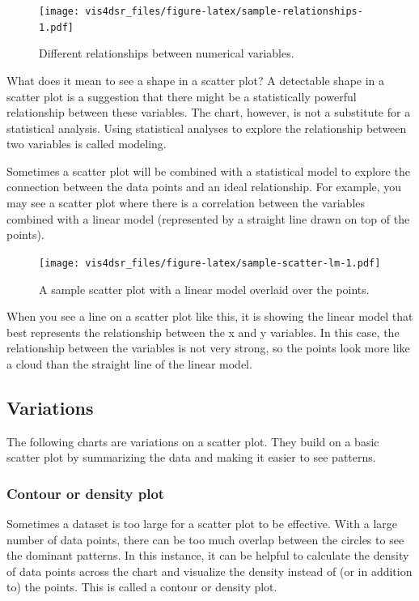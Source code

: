 \documentclass[
]{krantz}
\begin{document}
\begin{figure}
\centering
\texttt{[image: vis4dsr\_files/figure-latex/sample-relationships-1.pdf]}
\caption{\label{fig:sample-relationships}Different relationships between numerical variables.}
\end{figure}

What does it mean to see a shape in a scatter plot? A detectable shape in a scatter
plot is a suggestion that there might be a statistically powerful relationship
between these variables. The chart, however, is not a substitute for a statistical
analysis. Using statistical analyses to explore the relationship between two variables
is called modeling.

Sometimes a scatter plot will be combined with a statistical model to explore
the connection between the data points and an ideal relationship. For example, you
may see a scatter plot where there is a correlation between the variables
combined with a linear model (represented by a straight line drawn on top of the points).

\begin{figure}
\centering
\texttt{[image: vis4dsr\_files/figure-latex/sample-scatter-lm-1.pdf]}
\caption{\label{fig:sample-scatter-lm}A sample scatter plot with a linear model overlaid over the points.}
\end{figure}

When you see a line on a scatter plot like this, it is showing the linear model
that best represents the relationship between the x and y variables. In this case,
the relationship between the variables is not very strong, so the points look more
like a cloud than the straight line of the linear model.

\hypertarget{variations-1}{%
\subsection{Variations}\label{variations-1}}

The following charts are variations on a scatter plot. They build on a basic
scatter plot by summarizing the data and making it easier to see patterns.

\hypertarget{contour-or-density-plot}{%
\subsubsection{Contour or density plot}\label{contour-or-density-plot}}

Sometimes a dataset is too large for a scatter plot to be effective. With a large
number of data points, there can be too much overlap between the circles to see
the dominant patterns. In this instance, it can be helpful to calculate the density
of data points across the chart and visualize the density instead of (or in addition to)
the points. This is called a contour or density plot.
\end{document}
